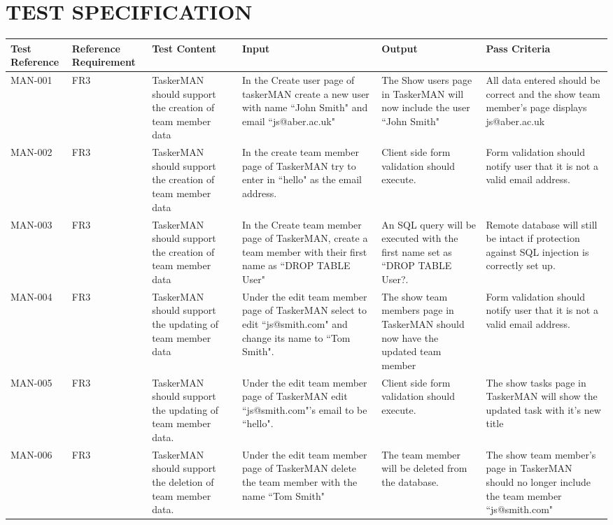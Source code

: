 \documentclass{project}
\begin{document}
\section{TEST SPECIFICATION}
\begin{longtable}{| p{1.8cm} | p{1.1cm} | p{2.8cm} | p{3.2cm} | p{3.2cm} | p{2.8cm} |}
\hline
Test Reference & Reference Requirement & Test Content & Input & Output & Pass Criteria \\ 
\hline
MAN-001 & FR3 & TaskerMAN should support the creation of team member data & In the Create user page of taskerMAN create a new user with name ``John Smith" and email ``js@aber.ac.uk"
 & The Show users page in TaskerMAN will now include the user ``John Smith" &All data entered should be correct and the show team member's page displays js@aber.ac.uk \\
\hline
MAN-002 & FR3 & TaskerMAN should support the creation of team member data & In the create team member page of TaskerMAN try to enter in ``hello" as the email address.  & Client side form validation should execute. & Form validation should notify user that it is not a valid email address. \\
\hline
MAN-003 & FR3 & TaskerMAN should support the creation of  team member data & In the Create team member page of TaskerMAN, create a team member with their first name as ``DROP TABLE User"  & An SQL query will be executed with the first name set as ``DROP TABLE User?. & Remote database will still be intact if protection against SQL injection is correctly set up. \\
\hline
MAN-004 & FR3 & TaskerMAN should support the updating of team member data & Under the edit team member page of TaskerMAN select to edit ``js@smith.com" and change its name to ``Tom Smith".   & The show team members page in TaskerMAN should now have the updated team member  & Form validation should notify user that it is not a valid email address.\\
\hline
MAN-005 & FR3 & TaskerMAN should support the updating of team member data.  & Under the edit team member page of TaskerMAN edit ``js@smith.com"'s email to be ``hello".  
 & Client side form validation should execute.  & The show tasks page in TaskerMAN will show the updated task with it's new title\\
\hline
MAN-006 & FR3 & TaskerMAN should support the deletion of team member data.  & Under the edit team member page of TaskerMAN delete the team member with the name ``Tom Smith" & The team member will be deleted from the database. & The show team member's page in TaskerMAN should no longer include the team member ``js@smith.com" \\

\end{longtable}
\end{document}
